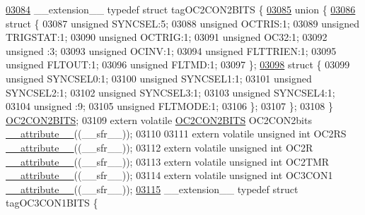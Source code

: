 \begin{DoxyCode}
\hypertarget{a00009_source_l03084}{}\hyperlink{a00008}{03084} \_\_extension\_\_ \textcolor{keyword}{typedef} \textcolor{keyword}{struct }tagOC2CON2BITS \{
\hypertarget{a00009_source_l03085}{}\hyperlink{a00009}{03085}   \textcolor{keyword}{union }\{
\hypertarget{a00009_source_l03086}{}\hyperlink{a00009}{03086}     \textcolor{keyword}{struct }\{
03087       \textcolor{keywordtype}{unsigned} SYNCSEL:5;
03088       \textcolor{keywordtype}{unsigned} OCTRIS:1;
03089       \textcolor{keywordtype}{unsigned} TRIGSTAT:1;
03090       \textcolor{keywordtype}{unsigned} OCTRIG:1;
03091       \textcolor{keywordtype}{unsigned} OC32:1;
03092       \textcolor{keywordtype}{unsigned} :3;
03093       \textcolor{keywordtype}{unsigned} OCINV:1;
03094       \textcolor{keywordtype}{unsigned} FLTTRIEN:1;
03095       \textcolor{keywordtype}{unsigned} FLTOUT:1;
03096       \textcolor{keywordtype}{unsigned} FLTMD:1;
03097     \};
\hypertarget{a00009_source_l03098}{}\hyperlink{a00009}{03098}     \textcolor{keyword}{struct }\{
03099       \textcolor{keywordtype}{unsigned} SYNCSEL0:1;
03100       \textcolor{keywordtype}{unsigned} SYNCSEL1:1;
03101       \textcolor{keywordtype}{unsigned} SYNCSEL2:1;
03102       \textcolor{keywordtype}{unsigned} SYNCSEL3:1;
03103       \textcolor{keywordtype}{unsigned} SYNCSEL4:1;
03104       \textcolor{keywordtype}{unsigned} :9;
03105       \textcolor{keywordtype}{unsigned} FLTMODE:1;
03106     \};
03107   \};
03108 \} \hyperlink{a00008_d5/dd8/a00615}{OC2CON2BITS};
03109 \textcolor{keyword}{extern} \textcolor{keyword}{volatile} \hyperlink{a00008_d5/dd8/a00615}{OC2CON2BITS} OC2CON2bits \hyperlink{a00009_a493c46f03454991ccc5aa7a6e1dfb2a7}{\_\_attribute\_\_}((\_\_sfr\_\_));
03110 
03111 \textcolor{keyword}{extern} \textcolor{keyword}{volatile} \textcolor{keywordtype}{unsigned} \textcolor{keywordtype}{int}  OC2RS \hyperlink{a00009_a493c46f03454991ccc5aa7a6e1dfb2a7}{\_\_attribute\_\_}((\_\_sfr\_\_));
03112 \textcolor{keyword}{extern} \textcolor{keyword}{volatile} \textcolor{keywordtype}{unsigned} \textcolor{keywordtype}{int}  OC2R \hyperlink{a00009_a493c46f03454991ccc5aa7a6e1dfb2a7}{\_\_attribute\_\_}((\_\_sfr\_\_));
03113 \textcolor{keyword}{extern} \textcolor{keyword}{volatile} \textcolor{keywordtype}{unsigned} \textcolor{keywordtype}{int}  OC2TMR \hyperlink{a00009_a493c46f03454991ccc5aa7a6e1dfb2a7}{\_\_attribute\_\_}((\_\_sfr\_\_));
03114 \textcolor{keyword}{extern} \textcolor{keyword}{volatile} \textcolor{keywordtype}{unsigned} \textcolor{keywordtype}{int}  OC3CON1 \hyperlink{a00009_a493c46f03454991ccc5aa7a6e1dfb2a7}{\_\_attribute\_\_}((\_\_sfr\_\_));
\hypertarget{a00009_source_l03115}{}\hyperlink{a00008}{03115} \_\_extension\_\_ \textcolor{keyword}{typedef} \textcolor{keyword}{struct }tagOC3CON1BITS \{

\end{DoxyCode}
